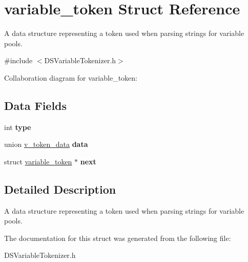 \hypertarget{structvariable__token}{
\section{variable\_\-token Struct Reference}
\label{structvariable__token}
}


A data structure representing a token used when parsing strings for variable pools.  




{\ttfamily \#include $<$DSVariableTokenizer.h$>$}



Collaboration diagram for variable\_\-token:\subsection*{Data Fields}
\begin{DoxyCompactItemize}
\item 
\hypertarget{structvariable__token_ac765329451135abec74c45e1897abf26}{
int {\bfseries type}}
\label{structvariable__token_ac765329451135abec74c45e1897abf26}

\item 
\hypertarget{structvariable__token_abadb6298bf7a87dc6563780925bdf8b6}{
union \hyperlink{unionv__token__data}{v\_\-token\_\-data} {\bfseries data}}
\label{structvariable__token_abadb6298bf7a87dc6563780925bdf8b6}

\item 
\hypertarget{structvariable__token_a6a66ebd102271a9e74dfe4e3ed2c31ca}{
struct \hyperlink{structvariable__token}{variable\_\-token} $\ast$ {\bfseries next}}
\label{structvariable__token_a6a66ebd102271a9e74dfe4e3ed2c31ca}

\end{DoxyCompactItemize}


\subsection{Detailed Description}
A data structure representing a token used when parsing strings for variable pools. 

The documentation for this struct was generated from the following file:\begin{DoxyCompactItemize}
\item 
DSVariableTokenizer.h\end{DoxyCompactItemize}
